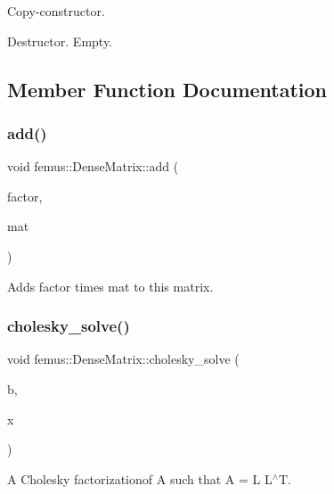 Copy-\/constructor. 

Destructor. Empty. 

\subsection{Member Function Documentation}
\mbox{\label{classfemus_1_1_dense_matrix_a3268040014359267e8d2fb9fbf187dac}} 
\subsubsection{\texorpdfstring{add()}{add()}}
{\footnotesize\ttfamily void femus\+::\+Dense\+Matrix\+::add (\begin{DoxyParamCaption}\item[{const double}]{factor,  }\item[{const \mbox{\hyperlink{classfemus_1_1_dense_matrix}{Dense\+Matrix}} \&}]{mat }\end{DoxyParamCaption})\hspace{0.3cm}{\ttfamily [inline]}}



Adds {\ttfamily factor} times {\ttfamily mat} to this matrix. 

\mbox{\label{classfemus_1_1_dense_matrix_aa21f4ae4b7277cf63799fad573382c9b}} 
\subsubsection{\texorpdfstring{cholesky\+\_\+solve()}{cholesky\_solve()}}
{\footnotesize\ttfamily void femus\+::\+Dense\+Matrix\+::cholesky\+\_\+solve (\begin{DoxyParamCaption}\item[{\mbox{\hyperlink{classfemus_1_1_dense_vector}{Dense\+Vector}} \&}]{b,  }\item[{\mbox{\hyperlink{classfemus_1_1_dense_vector}{Dense\+Vector}} \&}]{x }\end{DoxyParamCaption})}



A Cholesky factorizationof A such that A = L L$^\wedge$T. 

